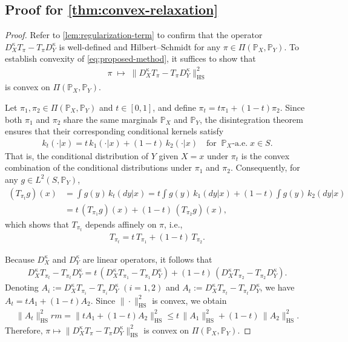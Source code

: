 \documentclass{article}
\begin{document}
\subsection{Proof for \cref{thm:convex-relaxation}}\label{pf:thm:convex-relaxation}
\begin{proof}
	Refer to \cref{lem:regularization-term} to confirm that the operator $D_X^{\kappa}T_{\pi} - T_{\pi}D_Y^{\kappa}$ is well-defined and Hilbert--Schmidt for any $\pi \in \Pi(\mathbb{P}_X,\mathbb{P}_Y)$. 
	To establish convexity of \eqref{eq:proposed-method}, it suffices to show that 
	\begin{align*}
	\pi \;\mapsto\; \|D_X^{\kappa}T_\pi - T_\pi D_Y^{\kappa}\|_{\mathrm{HS}}^2
	\end{align*}
	is convex on $\Pi(\mathbb{P}_X,\mathbb{P}_Y)$.
	
	Let $\pi_1,\pi_2 \in \Pi(\mathbb{P}_X,\mathbb{P}_Y)$ and $t \in [0,1]$, and define $\pi_t = t\pi_1 + (1-t)\pi_2$. 
	Since both $\pi_1$ and $\pi_2$ share the same marginals $\mathbb{P}_X$ and $\mathbb{P}_Y$, 
	the disintegration theorem ensures that their corresponding conditional kernels satisfy
	\begin{align*}
	k_t(\cdot|x) = t\,k_1(\cdot|x) + (1-t)\,k_2(\cdot|x)
	\quad \text{for} \;\; \mathbb{P}_X\text{-a.e.} \; x \in S.
	\end{align*}
	That is, the conditional distribution of $Y$ given $X=x$ under $\pi_t$ is the convex combination of the conditional distributions under $\pi_1$ and $\pi_2$. 
	Consequently, for any $g \in L^2(S,\mathbb{P}_Y)$,
	\begin{align*}
		(T_{\pi_t} g)(x)
		&= \int g(y)\,k_t(dy|x)
		= t \int g(y)\,k_1(dy|x) + (1-t)\int g(y)\,k_2(dy|x) \\
		&= t\,(T_{\pi_1}g)(x) + (1-t)\,(T_{\pi_2}g)(x),
	\end{align*}
	which shows that $T_{\pi_t}$ depends affinely on $\pi$, i.e.,
	\begin{align*}
	T_{\pi_t} = t\,T_{\pi_1} + (1-t)\,T_{\pi_2}.
	\end{align*}
	
	Because $D_X^{\kappa}$ and $D_Y^{\kappa}$ are linear operators, it follows that
	\begin{align*}
	D_X^{\kappa}T_{\pi_t} - T_{\pi_t}D_Y^{\kappa}
	= t\,(D_X^{\kappa}T_{\pi_1} - T_{\pi_1}D_Y^{\kappa})
	+ (1-t)\,(D_X^{\kappa}T_{\pi_2} - T_{\pi_2}D_Y^{\kappa}).
	\end{align*}
	Denoting $A_i := D_X^{\kappa}T_{\pi_i} - T_{\pi_i}D_Y^{\kappa}$ $(i=1,2)$ and $A_t := D_X^{\kappa}T_{\pi_t} - T_{\pi_t}D_Y^{\kappa}$, 
	we have $A_t = tA_1 + (1-t)A_2$. 
	Since $\|\cdot\|_{\mathrm{HS}}^2$ is convex, we obtain
	\begin{align*}
	\|A_t\|_{\mathrm{HS}}^2rm
	= \|tA_1 + (1-t)A_2\|_{\mathrm{HS}}^2
	\le t\,\|A_1\|_{\mathrm{HS}}^2 + (1-t)\,\|A_2\|_{\mathrm{HS}}^2.
	\end{align*}
	Therefore, $\pi \mapsto \|D_X^{\kappa}T_\pi - T_\pi D_Y^{\kappa}\|_{\mathrm{HS}}^2$ is convex on $\Pi(\mathbb{P}_X,\mathbb{P}_Y)$. 
\end{proof}
\end{document}
